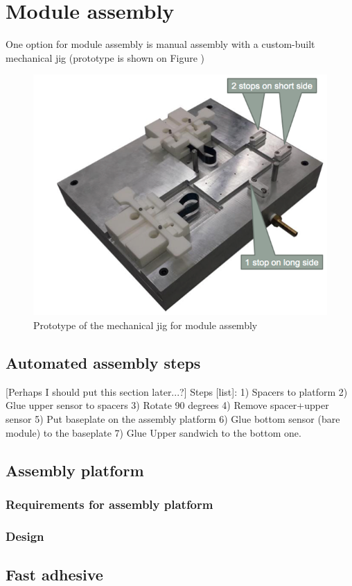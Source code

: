 \chapter{Module assembly}

One option for module assembly is manual assembly with a custom-built mechanical jig (prototype is shown on Figure )

\begin{figure}[ht]\centering
\includegraphics[width=0.8\linewidth]{Data/Module_assembly/Mechanical_jig.png}
\caption{Prototype of the mechanical jig for module assembly}
\label{fig:mechanical jig}
\end{figure}

\section{Automated assembly steps}

[Perhaps I should put this section later...?]
Steps [list]:
1) Spacers to platform
2) Glue upper sensor to spacers
3) Rotate 90 degrees
4) Remove spacer+upper sensor
5) Put baseplate on the assembly platform
6) Glue bottom sensor (bare module) to the baseplate
7) Glue Upper sandwich to the bottom one.


\section{Assembly platform}




\subsection{Requirements for assembly platform}



\subsection{Design}



\section{Fast adhesive}

